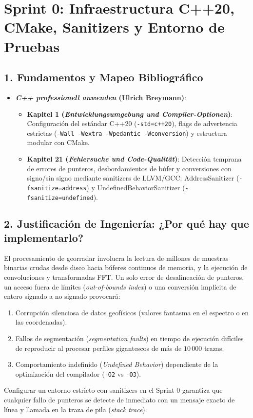 \documentclass[11pt,a4paper]{article}
\begin{document}
\section{Sprint 0: Infraestructura C++20, CMake, Sanitizers y Entorno de Pruebas}

\subsection{1. Fundamentos y Mapeo Bibliográfico}
\begin{itemize}
    \item \textbf{\textit{C++ professionell anwenden} (Ulrich Breymann)}:
    \begin{itemize}
        \item \textbf{Kapitel 1 (\textit{Entwicklungsumgebung und Compiler-Optionen})}: Configuración del estándar C++20 (\texttt{-std=c++20}), flags de advertencia estrictas (\texttt{-Wall -Wextra -Wpedantic -Wconversion}) y estructura modular con CMake.
        \item \textbf{Kapitel 21 (\textit{Fehlersuche und Code-Qualität})}: Detección temprana de errores de punteros, desbordamientos de búfer y conversiones con signo/sin signo mediante sanitizers de LLVM/GCC: AddressSanitizer (\texttt{-fsanitize=address}) y UndefinedBehaviorSanitizer (\texttt{-fsanitize=undefined}).
    \end{itemize}
\end{itemize}

\subsection{2. Justificación de Ingeniería: ¿Por qué hay que implementarlo?}
El procesamiento de georradar involucra la lectura de millones de muestras binarias crudas desde disco hacia búferes continuos de memoria, y la ejecución de convoluciones y transformadas FFT. Un solo error de desalineación de punteros, un acceso fuera de límites (\textit{out-of-bounds index}) o una conversión implícita de entero signado a no signado provocará:
\begin{enumerate}
    \item Corrupción silenciosa de datos geofísicos (valores fantasma en el espectro o en las coordenadas).
    \item Fallos de segmentación (\textit{segmentation faults}) en tiempo de ejecución difíciles de reproducir al procesar perfiles gigantescos de más de $10\,000$ trazas.
    \item Comportamiento indefinido (\textit{Undefined Behavior}) dependiente de la optimización del compilador (\texttt{-O2} vs \texttt{-O3}).
\end{enumerate}
Configurar un entorno estricto con sanitizers en el Sprint 0 garantiza que cualquier fallo de punteros se detecte de inmediato con un mensaje exacto de línea y llamada en la traza de pila (\textit{stack trace}).
\end{document}
